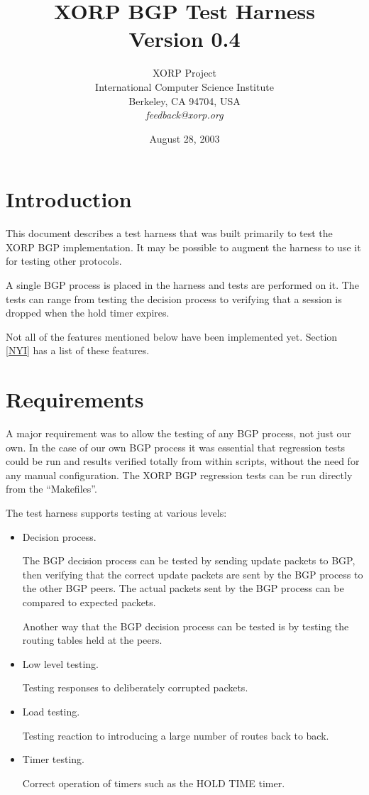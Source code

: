 \documentclass[11pt]{article}
\title{XORP BGP Test Harness \\
\vspace{1ex}
Version 0.4}
\author{ XORP Project                                   \\
         International Computer Science Institute       \\
         Berkeley, CA 94704, USA                        \\
         {\it feedback@xorp.org}
}
\date{August 28, 2003}
\begin{document}
\maketitle

\section{Introduction}

This document describes a test harness that was built primarily to
test the XORP BGP implementation. It may be possible to augment the
harness to use it for testing other protocols.

A single BGP process is placed in the harness and tests
are performed on it. The tests can range from testing the decision
process to verifying that a session is dropped when the hold timer expires.

Not all of the features mentioned below have been implemented yet.
Section \ref{NYI} has a list of these features.

\section{Requirements}

A major requirement was to allow the testing of any BGP process, not
just our own. In the case of our own BGP process it was essential that
regression tests could be run and results verified totally from within
scripts, without the need for any manual configuration. The
XORP BGP regression tests can be run directly from the ``Makefiles''.
\newline

The test harness supports testing at various levels:

\begin{itemize}
\item Decision process.

  The BGP decision process can be tested by sending update packets to
  BGP, then verifying that the correct update packets are sent by the
  BGP process to the other BGP peers. The actual packets sent by the
  BGP process can be compared to expected packets. 

  Another way that the BGP decision process can be tested is by
  testing the routing tables held at the peers.

\item Low level testing.

 Testing responses to deliberately corrupted packets.

\item Load testing. 

  Testing reaction to introducing a large number of routes back
  to back.

\item Timer testing.

  Correct operation of timers such as the HOLD TIME timer.

\end{itemize}
\end{document}
